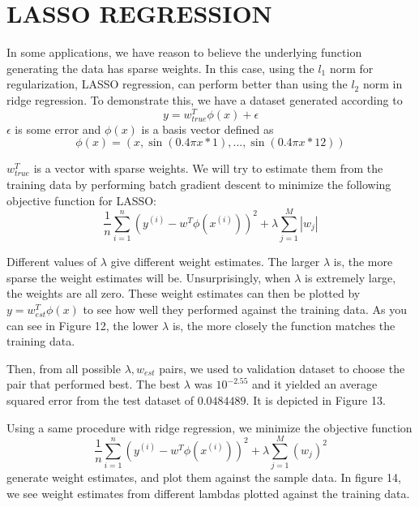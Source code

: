 \documentclass[a4paper,twoside]{article}
\begin{document}

\section{\uppercase{LASSO Regression}}
In some applications, we have reason to believe the underlying function generating the data has sparse weights. In this case, using the $l_1$ norm for regularization, LASSO regression, can perform better than using the $l_2$ norm in ridge regression. To demonstrate this, we have a dataset generated according to 
\begin{equation}
y = w_{true}^T \phi (x) + \epsilon
\end{equation}
$\epsilon$ is some error and $\phi (x)$ is a basis vector defined as 
\begin{equation}
\phi(x) = (x, \sin(0.4 \pi x * 1), ..., \sin(0.4 \pi x * 12))
\end{equation}

$w_{true}^T$ is a vector with sparse weights. We will try to estimate them from the training data by performing batch gradient descent to minimize the following objective function for LASSO:
\begin{equation}
\frac{1}{n} \sum_{i=1}^{n} (y^{(i)} - w^T \phi(x^{(i)}))^2 + \lambda \sum_{j=1}^{M} |w_j|
\end{equation}

Different values of $\lambda$ give different weight estimates. The larger $\lambda$ is, the more sparse the weight estimates will be. Unsurprisingly, when $\lambda$ is extremely large, the weights are all zero. These weight estimates can then be plotted by $y = w_{est}^T \phi (x)$ to see how well they performed against the training data. As you can see in Figure 12, the lower $\lambda$ is, the more closely the function matches the training data.

Then, from all possible $\lambda, w_{est}$ pairs, we used to validation dataset to choose the pair that performed best. The best $\lambda$ was $10^{-2.55}$ and it yielded an average squared error from the test dataset of $0.0484489$. It is depicted in Figure 13.

Using a same procedure with ridge regression, we minimize the objective function
\begin{equation}
\frac{1}{n} \sum_{i=1}^{n} (y^{(i)} - w^T \phi(x^{(i)}))^2 + \lambda \sum_{j=1}^{M} (w_j)^2
\end{equation}
generate weight estimates, and plot them against the sample data. In figure 14, we see weight estimates from different lambdas plotted against the training data.
\end{document}
